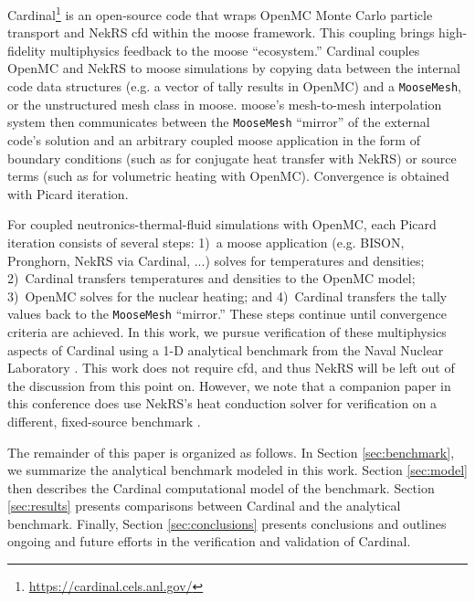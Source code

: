\documentclass[letterpaper]{mc2023}
\begin{document}
Cardinal\footnote{\url{https://cardinal.cels.anl.gov/}} is an open-source code \cite{novak2022-cardinal}
that wraps OpenMC \cite{openmc} Monte Carlo particle transport and NekRS \cite{nekrs} \gls{cfd} within the \gls{moose}
\cite{lindsay2022moose} framework. This coupling brings high-fidelity multiphysics feedback to the \gls{moose} ``ecosystem.''
Cardinal couples OpenMC and NekRS to \gls{moose} simulations by copying data between the internal code data structures
(e.g. a vector of tally results in OpenMC) and a \texttt{MooseMesh}, or the unstructured mesh class in \gls{moose}. \gls{moose}'s
mesh-to-mesh interpolation system then communicates between the \texttt{MooseMesh} ``mirror'' of the external code's solution
and an arbitrary coupled \gls{moose} application in the form of boundary conditions (such as for conjugate heat transfer with
NekRS) or source terms (such as for volumetric heating with OpenMC). Convergence is obtained with Picard iteration.

For coupled neutronics-thermal-fluid simulations with OpenMC, each Picard iteration consists of several steps: 1)~a \gls{moose}
application (e.g. BISON, Pronghorn, NekRS via Cardinal, ...) solves for temperatures and densities; 2)~Cardinal transfers
temperatures and densities to the OpenMC model; 3)~OpenMC solves for the nuclear heating; and 4)~Cardinal transfers the tally
values back to the \texttt{MooseMesh} ``mirror.'' These steps continue until convergence criteria are achieved. In this work, we
pursue verification of these multiphysics aspects of Cardinal using a 1-D analytical benchmark from the Naval Nuclear Laboratory
\cite{analytical-benchmark}. This work does not require \gls{cfd}, and thus NekRS will be left out of the discussion from this
point on. However, we note that a companion paper in this conference does use NekRS's heat conduction solver for verification on
a different, fixed-source benchmark \cite{aya2023}.

The remainder of this paper is organized as follows. In Section \ref{sec:benchmark}, we summarize the analytical benchmark
modeled in this work. Section \ref{sec:model} then describes the Cardinal computational model of the benchmark. Section
\ref{sec:results} presents comparisons between Cardinal and the analytical benchmark. Finally, Section \ref{sec:conclusions}
presents conclusions and outlines ongoing and future efforts in the verification and validation of Cardinal.
\end{document}
